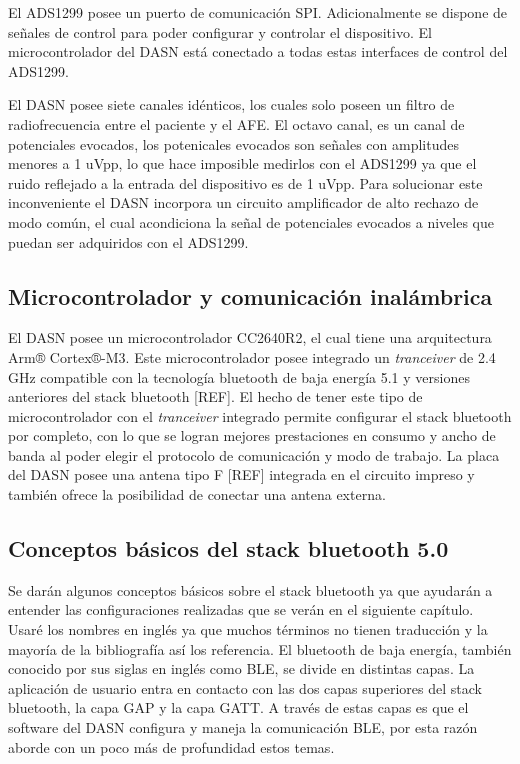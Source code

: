 El ADS1299 posee un puerto de comunicación SPI. Adicionalmente se dispone de señales de control para poder configurar y controlar el dispositivo. El microcontrolador del DASN está conectado a todas estas interfaces de control del ADS1299.

El DASN posee siete canales idénticos, los cuales solo poseen un filtro de radiofrecuencia entre el paciente y el AFE. El octavo canal, es un canal de potenciales evocados, los potenicales evocados son señales con amplitudes menores a 1 uVpp, lo que hace imposible medirlos con el ADS1299 ya que el ruido reflejado a la entrada del dispositivo es de 1 uVpp. Para solucionar este inconveniente el DASN incorpora un circuito amplificador de alto rechazo de modo común, el cual acondiciona la señal de potenciales evocados a niveles que puedan ser adquiridos con el ADS1299. 

\subsection{Microcontrolador y comunicación inalámbrica}
El DASN posee un microcontrolador CC2640R2, el cual tiene una arquitectura Arm® Cortex®-M3. Este microcontrolador posee integrado un \textit{tranceiver} de 2.4 GHz compatible con la tecnología bluetooth de baja energía 5.1 y versiones anteriores del stack bluetooth [REF]. El hecho de tener este tipo de microcontrolador con el \textit{tranceiver} integrado permite configurar el stack bluetooth por completo, con lo que se logran mejores prestaciones en consumo y ancho de banda al poder elegir el protocolo de comunicación y modo de trabajo. La placa del DASN posee una antena tipo F [REF] integrada en el circuito impreso y también ofrece la posibilidad de conectar una antena externa. 

\subsection{Conceptos básicos del stack bluetooth 5.0}
Se darán algunos conceptos básicos sobre el stack bluetooth ya que ayudarán a entender las configuraciones realizadas que se verán en el siguiente capítulo. Usaré los nombres en inglés ya que muchos términos no tienen traducción y la mayoría de la bibliografía así los referencia. El bluetooth de baja energía, también conocido por sus siglas en inglés como BLE, se divide en distintas capas. La aplicación de usuario entra en contacto con las dos capas superiores del stack bluetooth, la capa GAP y la capa GATT. A través de estas capas es que el software del DASN configura y maneja la comunicación BLE, por esta razón aborde con un poco más de profundidad estos temas.

